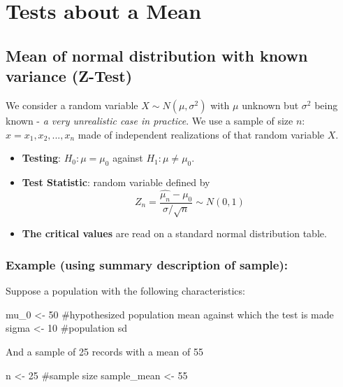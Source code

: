 \documentclass[
  letterpaper,
  DIV=11,
  numbers=noendperiod]{scrreprt}
\newenvironment{Shaded}{\begin{snugshade}}{\end{snugshade}}
\newcommand{\CommentTok}[1]{\textcolor[rgb]{0.37,0.37,0.37}{#1}}
\newcommand{\DecValTok}[1]{\textcolor[rgb]{0.68,0.00,0.00}{#1}}
\newcommand{\NormalTok}[1]{\textcolor[rgb]{0.00,0.23,0.31}{#1}}
\newcommand{\OtherTok}[1]{\textcolor[rgb]{0.00,0.23,0.31}{#1}}
\providecommand{\tightlist}{%
  \setlength{\itemsep}{0pt}\setlength{\parskip}{0pt}}\usepackage{longtable,booktabs,array}
\begin{document}
\section{Tests about a Mean}\label{tests-about-a-mean}

\subsection{Mean of normal distribution with known variance
(Z-Test)}\label{mean-of-normal-distribution-with-known-variance-z-test}

We consider a random variable \(X \sim N(\mu, \sigma^2)\) with \(\mu\)
unknown but \(\sigma^2\) being known - \emph{a very unrealistic case in
practice}. We use a sample of size \(n\): \(x = {x_1, x_2,..., x_n}\)
made of independent realizations of that random variable \(X\).

\begin{itemize}
\tightlist
\item
  \textbf{Testing}: \(H_0: \mu = \mu_0\) against
  \(H_1: \mu \neq \mu_0\).
\item
  \textbf{Test Statistic}: random variable defined by
  \[Z_n = \dfrac{\hat{\mu_n} - \mu_0}{\sigma / \sqrt{n}} \sim N(0, 1)\]
\item
  \textbf{The critical values} are read on a standard normal
  distribution table.
\end{itemize}

\subsubsection{Example (using summary description of
sample):}\label{example-using-summary-description-of-sample}

Suppose a population with the following characteristics:

\begin{Shaded}
\begin{Highlighting}[]
\NormalTok{mu\_0 }\OtherTok{\textless{}{-}} \DecValTok{50} \CommentTok{\#hypothesized population mean against which the test is made}
\NormalTok{sigma }\OtherTok{\textless{}{-}} \DecValTok{10} \CommentTok{\#population sd}
\end{Highlighting}
\end{Shaded}

And a sample of 25 records with a mean of 55

\begin{Shaded}
\begin{Highlighting}[]
\NormalTok{n }\OtherTok{\textless{}{-}} \DecValTok{25} \CommentTok{\#sample size}
\NormalTok{sample\_mean }\OtherTok{\textless{}{-}} \DecValTok{55}
\end{Highlighting}
\end{Shaded}
\end{document}
